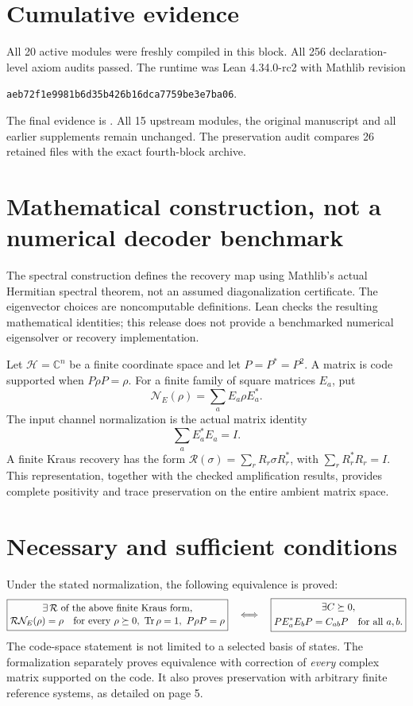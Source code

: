 \documentclass[10pt,letterpaper]{article}
\newcommand{\C}{\mathbb C}\newcommand{\R}{\mathbb R}
\newcommand{\pageheading}[2]{\vspace*{2pt}{\small\color{ink}\textsc{#1}}\par\vspace{2pt}{\Large\bfseries #2}\par\vspace{4pt}}
\begin{document}
\section*{Cumulative evidence}
All 20 active modules were freshly compiled in this block. All 256 declaration-level axiom audits passed. The runtime was Lean 4.34.0-rc2 with Mathlib revision
\begin{center}\small\texttt{aeb72f1e9981b6d35b426b16dca7759be3e7ba06}.\end{center}
The final evidence is . All 15 upstream modules, the original manuscript and all earlier supplements remain unchanged. The preservation audit compares 26 retained files with the exact fourth-block archive.

\section*{Mathematical construction, not a numerical decoder benchmark}
The spectral construction defines the recovery map using Mathlib's actual Hermitian spectral theorem, not an assumed diagonalization certificate. The eigenvector choices are noncomputable definitions. Lean checks the resulting mathematical identities; this release does not provide a benchmarked numerical eigensolver or recovery implementation.

\newpage
\pageheading{Item 8.1 completed}{The precise finite channel statement}
Let $\mathcal H=\C^n$ be a finite coordinate space and let $P=P^*=P^2$. A matrix is code supported when $P\rho P=\rho$. For a finite family of square matrices $E_a$, put
\[
\mathcal N_E(\rho)=\sum_a E_a\rho E_a^*.
\]
The input channel normalization is the actual matrix identity
\[
\sum_a E_a^*E_a=I.
\]
A finite Kraus recovery has the form $\mathcal R(\sigma)=\sum_r R_r\sigma R_r^*$, with $\sum_rR_r^*R_r=I$. This representation, together with the checked amplification results, provides complete positivity and trace preservation on the entire ambient matrix space.

\section*{Necessary and sufficient conditions}
Under the stated normalization, the following equivalence is proved:
\[
\boxed{\begin{gathered}
\exists\,\mathcal R\text{ of the above finite Kraus form,}\\[-2pt]
\mathcal R\mathcal N_E(\rho)=\rho
\quad\text{for every }\rho\succeq0,\ \operatorname{Tr}\rho=1,\ P\rho P=\rho
\end{gathered}}
\quad\Longleftrightarrow\quad
\boxed{\begin{gathered}
\exists C\succeq0,\\
PE_a^*E_bP=C_{ab}P\quad\text{for all }a,b.
\end{gathered}}
\]
The code-space statement is not limited to a selected basis of states. The formalization separately proves equivalence with correction of \emph{every} complex matrix supported on the code. It also proves preservation with arbitrary finite reference systems, as detailed on page 5.
\end{document}
